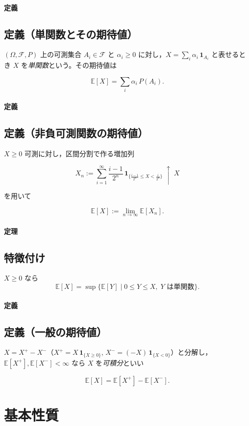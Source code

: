 \documentclass[uplatex,dvipdfmx,11pt,a4paper,openany]{bxjsbook}
\begin{document}
\paragraph{定義}
\subsection{定義（単関数とその期待値）}
$(\Omega,\mathcal F,P)$ 上の可測集合 $A_i\in\mathcal F$ と $\alpha_i\ge0$ に対し，$X=\sum_i \alpha_i\,\mathbf 1_{A_i}$ と表せるとき $X$ を\emph{単関数}という。その期待値は

\[\mathbb{E}[X]=\sum_i \alpha_i\,P(A_i).\]


\paragraph{定義}
\subsection{定義（非負可測関数の期待値）}
$X\ge0$ 可測に対し，区間分割で作る増加列

\[X_n:=\sum_{i=1}^{\infty} \frac{i-1}{2^n}\,\mathbf 1_{\{\frac{i-1}{2^n}\le X<\frac{i}{2^n}\}}\;\uparrow\; X\]

を用いて

\[\mathbb{E}[X]:=\lim_{n\to\infty}\mathbb{E}[X_n].\]


\paragraph{定理}
\subsection{特徴付け}
$X\ge0$ なら \[\mathbb{E}[X]=\sup\{\mathbb{E}[Y]\mid 0\le Y\le X,\;Y\text{ は単関数}\}.\]


\paragraph{定義}
\subsection{定義（一般の期待値）}
$X=X^+-X^-$（$X^+=X\,\mathbf 1_{\{X\ge0\}}$, $X^-=(-X)\,\mathbf 1_{\{X<0\}}$）と分解し，$\mathbb{E}[X^+],\mathbb{E}[X^-]<\infty$ なら $X$ を\emph{可積分}といい

\[\mathbb{E}[X]=\mathbb{E}[X^+]-\mathbb{E}[X^-].\]


\section{基本性質}
\end{document}

